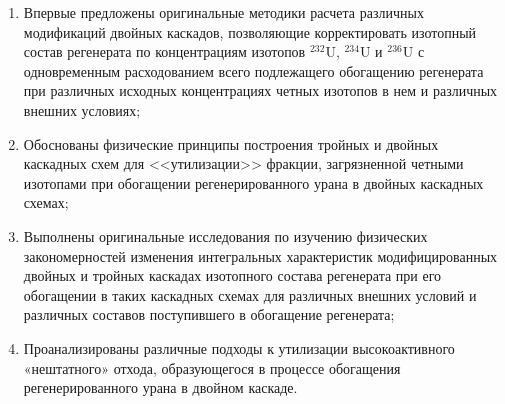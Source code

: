 {\novelty}
\begin{enumerate}
  \item Впервые предложены оригинальные методики расчета различных модификаций двойных каскадов, позволяющие корректировать
  изотопный состав регенерата по концентрациям изотопов $^{232}$U, $^{234}$U и $^{236}$U с одновременным расходованием всего подлежащего обогащению регенерата при различных исходных концентрациях четных изотопов в нем и различных внешних условиях;
  \item Обоснованы физические принципы построения тройных и двойных каскадных схем для <<утилизации>> фракции, загрязненной четными изотопами при обогащении регенерированного урана в двойных каскадных схемах;
  \item Выполнены оригинальные исследования по изучению физических закономерностей изменения интегральных характеристик модифицированных двойных и тройных каскадах изотопного состава регенерата при его обогащении в таких каскадных схемах для различных внешних условий и различных составов поступившего в обогащение регенерата;
  \item Проанализированы различные подходы к утилизации высокоактивного «нештатного» отхода, образующегося в процессе обогащения регенерированного урана в двойном каскаде.
\end{enumerate}

